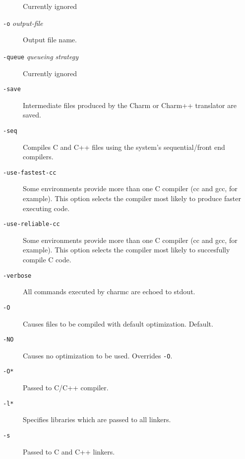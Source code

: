 \begin{description}
Currently ignored

\item[{\tt -o} {\em output-file}]

Output file name.

\item[{\tt -queue} {\em queueing strategy}]

Currently ignored

\item[{\tt -save}]

Intermediate files produced by the Charm or Charm++ translator are saved.

\item[{\tt -seq}]

Compiles C and C++ files using the system's sequential/front end
compilers.

\item[{\tt -use-fastest-cc}]

Some environments provide more than one C compiler (cc and gcc, for
example).  This option selects the compiler most likely to produce
faster executing code.

\item[{\tt -use-reliable-cc}]

Some environments provide more than one C compiler (cc and gcc, for
example).  This option selects the compiler most likely to succesfully
compile C code.

\item[{\tt -verbose}]

All commands executed by charmc are echoed to stdout.

\item[{\tt -O}]

Causes files to be compiled with default optimization.  Default.

\item[{\tt -NO}]

Causes no optimization to be used.  Overrides {\tt -O}.

\item[{\tt -O*}]

Passed to C/C++ compiler.

\item[{\tt -l*}]

Specifies libraries which are passed to all linkers.

\item[{\tt -s}]

Passed to C and C++ linkers.

\end{description}



